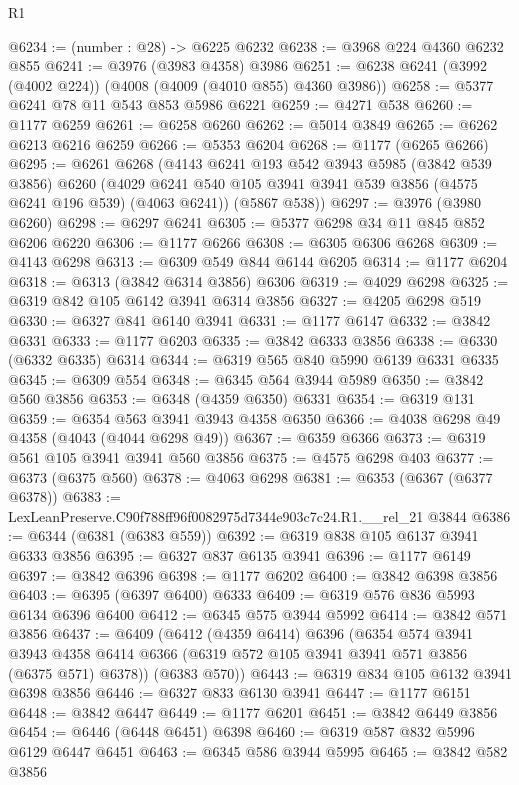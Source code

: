 \begin{lexlean}{R1}
\begin{coremodule}
@6234 := (number : @28) -> @6225 @6232
@6238 := @3968 @224 @4360 @6232 @855
@6241 := @3976 (@3983 @4358) @3986
@6251 := @6238 @6241 (@3992 (@4002 @224)) (@4008 (@4009 (@4010 @855) @4360 @3986))
@6258 := @5377 @6241 @78 @11 @543 @853 @5986 @6221
@6259 := @4271 @538
@6260 := @1177 @6259
@6261 := @6258 @6260
@6262 := @5014 @3849
@6265 := @6262 @6213 @6216 @6259
@6266 := @5353 @6204
@6268 := @1177 (@6265 @6266)
@6295 := @6261
    @6268
    (@4143
      @6241
      @193
      @542
      @3943
      @5985
      (@3842 @539 @3856)
      @6260
      (@4029 @6241 @540 @105 @3941 @3941 @539 @3856 (@4575 @6241 @196 @539) (@4063 @6241))
      (@5867 @538))
@6297 := @3976 (@3980 @6260)
@6298 := @6297 @6241
@6305 := @5377 @6298 @34 @11 @845 @852 @6206 @6220
@6306 := @1177 @6266
@6308 := @6305 @6306 @6268
@6309 := @4143 @6298
@6313 := @6309 @549 @844 @6144 @6205
@6314 := @1177 @6204
@6318 := @6313 (@3842 @6314 @3856) @6306
@6319 := @4029 @6298
@6325 := @6319 @842 @105 @6142 @3941 @6314 @3856
@6327 := @4205 @6298 @519
@6330 := @6327 @841 @6140 @3941
@6331 := @1177 @6147
@6332 := @3842 @6331
@6333 := @1177 @6203
@6335 := @3842 @6333 @3856
@6338 := @6330 (@6332 @6335) @6314
@6344 := @6319 @565 @840 @5990 @6139 @6331 @6335
@6345 := @6309 @554
@6348 := @6345 @564 @3944 @5989
@6350 := @3842 @560 @3856
@6353 := @6348 (@4359 @6350) @6331
@6354 := @6319 @131
@6359 := @6354 @563 @3941 @3943 @4358 @6350
@6366 := @4038 @6298 @49 @4358 (@4043 (@4044 @6298 @49))
@6367 := @6359 @6366
@6373 := @6319 @561 @105 @3941 @3941 @560 @3856
@6375 := @4575 @6298 @403
@6377 := @6373 (@6375 @560)
@6378 := @4063 @6298
@6381 := @6353 (@6367 (@6377 @6378))
@6383 := LexLeanPreserve.C90f788ff96f0082975d7344e903c7c24.R1.__rel_21 @3844
@6386 := @6344 (@6381 (@6383 @559))
@6392 := @6319 @838 @105 @6137 @3941 @6333 @3856
@6395 := @6327 @837 @6135 @3941
@6396 := @1177 @6149
@6397 := @3842 @6396
@6398 := @1177 @6202
@6400 := @3842 @6398 @3856
@6403 := @6395 (@6397 @6400) @6333
@6409 := @6319 @576 @836 @5993 @6134 @6396 @6400
@6412 := @6345 @575 @3944 @5992
@6414 := @3842 @571 @3856
@6437 := @6409
    (@6412
      (@4359 @6414)
      @6396
      (@6354
        @574
        @3941
        @3943
        @4358
        @6414
        @6366
        (@6319 @572 @105 @3941 @3941 @571 @3856 (@6375 @571) @6378))
      (@6383 @570))
@6443 := @6319 @834 @105 @6132 @3941 @6398 @3856
@6446 := @6327 @833 @6130 @3941
@6447 := @1177 @6151
@6448 := @3842 @6447
@6449 := @1177 @6201
@6451 := @3842 @6449 @3856
@6454 := @6446 (@6448 @6451) @6398
@6460 := @6319 @587 @832 @5996 @6129 @6447 @6451
@6463 := @6345 @586 @3944 @5995
@6465 := @3842 @582 @3856

\end{coremodule}
\end{lexlean}
